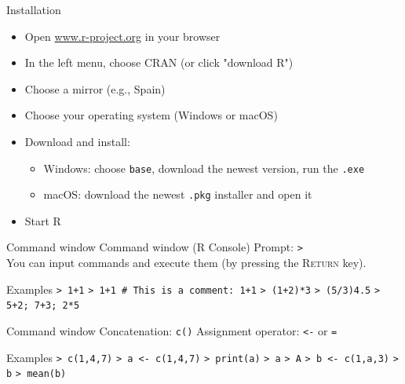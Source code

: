 \documentclass[aspectratio=169]{beamer}
\begin{document}
\begin{frame}{Installation}
\begin{itemize}
    \item Open \url{www.r-project.org} in your browser\smallskip
    \item In the left menu, choose CRAN (or click "download R")\smallskip
    \item Choose a mirror (e.g., Spain)\smallskip
    \item Choose your operating system (Windows or macOS)\smallskip
    \item Download and install:
    \begin{itemize}
        \item[$\bullet$] Windows: choose \texttt{base}, download the newest version, run the \texttt{.exe}
        \item[$\bullet$] macOS: download the newest \texttt{.pkg} installer and open it\smallskip
    \end{itemize}
    \item Start R
\end{itemize}
\end{frame}

\begin{frame}{Command window}
Command window (R Console) Prompt: \texttt{>} \\
You can input commands and execute them (by pressing the \textsc{Return} key).
\begin{coolblock}{Examples}
\texttt{> 1+1}\newline
\texttt{> 1+1 \# This is a comment: 1+1}\newline
\texttt{> (1+2)*3}\newline
\texttt{> (5/3)4.5}\newline
\texttt{> 5+2; 7+3; 2*5}
\end{coolblock}
\end{frame}

\begin{frame}{Command window}
Concatenation: \texttt{c()} \newline
Assignment operator: \texttt{<-} or \texttt{=}
\begin{coolblock}{Examples}
\texttt{> c(1,4,7)}\newline
\texttt{> a <- c(1,4,7)}\newline
\texttt{> print(a)}\newline
\texttt{> a}\newline
\texttt{> A}\newline
\texttt{> b <- c(1,a,3)}\newline
\texttt{> b}\newline
\texttt{> mean(b)}
\end{coolblock}
\end{frame}
\end{document}
